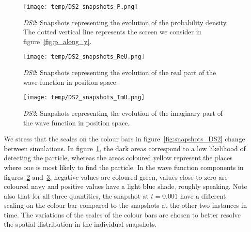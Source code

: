     \begin{figure*}
        \centering
        \begin{subfigure}{0.92\textwidth}
            \texttt{[image: temp/DS2\_snapshots\_P.png]}
            \caption{\textit{DS2}: Snapshots representing the evolution of the probability density. The dotted vertical line represents the screen we consider in figure~\ref{fig:p_along_y}.}
            \label{fig:snapshots_p_DS2}
        \end{subfigure}
        \hfill
        \begin{subfigure}{0.92\textwidth}
            \texttt{[image: temp/DS2\_snapshots\_ReU.png]}
            \caption{\textit{DS2}: Snapshots representing the evolution of the real part of the wave function in position space.}
            \label{fig:snapshots_ReU_DS2}
        \end{subfigure}
        \hfill
        \begin{subfigure}{0.92\textwidth}
            \texttt{[image: temp/DS2\_snapshots\_ImU.png]}
            \caption{\textit{DS2}: Snapshots representing the evolution of the imaginary part of the wave function in position space.}
            \label{fig:snapshots_ImU_DS2}
        \end{subfigure}
        \caption{Colour maps showing the solution of the Schrödinger equation for the \textit{DS2} setup at times $t=0.000,\, 0.001, \,0.002$. Pay attention to the varying colour bar scale from frame to frame.}
        \label{fig:snapshots_DS2}
    \end{figure*}

    We stress that the scales on the colour bars in figure~\ref{fig:snapshots_DS2} change between simulations. In figure~\ref{fig:snapshots_p_DS2}, the dark areas correspond to a low likelihood of detecting the particle, whereas the areas coloured yellow represent the places where one is most likely to find the particle. In the wave function components in figures~\ref{fig:snapshots_ReU_DS2} and~\ref{fig:snapshots_ImU_DS2}, negative values are coloured green, values close to zero are coloured navy and positive values have a light blue shade, roughly speaking. Note also that for all three quantities, the snapshot at $t=0.001$ have a different scaling on the colour bar compared to the snapshots at the other two instances in time. The variations of the scales of the colour bars are chosen to better resolve the spatial distribution in the individual snapshots.

